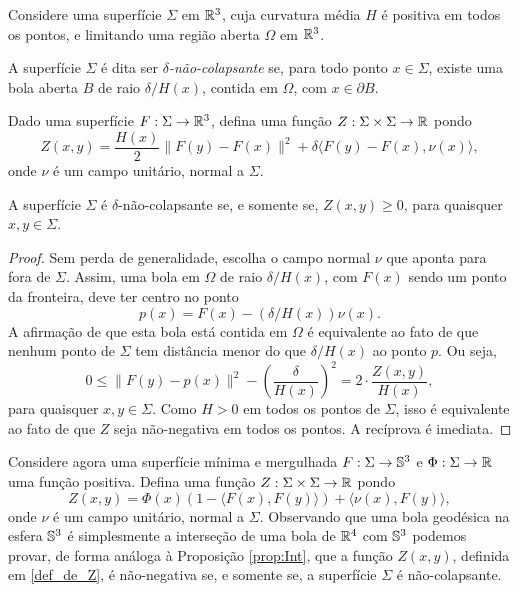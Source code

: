 Considere uma superf\'icie $\Sigma$ em $\mathbb R^3$, cuja curvatura
m\'edia $H$ \'e positiva em todos os pontos, e limitando uma 
regi\~ao aberta $\Omega$ em $\mathbb R^3$.

\begin{definicao}
	A superf\'icie $\Sigma$ \'e dita ser {\em $\delta$-n\~ao-colapsante}
	se, para todo ponto $x\in\Sigma$, existe uma bola aberta $B$ de
	raio $\delta/H(x)$, contida em $\Omega$, com $x\in\partial B$. 
\end{definicao}

Dado uma superf\'icie $F:\Sigma\to\mathbb R^3$, defina uma fun\c c\~ao
$Z:\Sigma\times\Sigma\to\mathbb R$ pondo
\[
Z(x,y) = \frac{H(x)}{2}\|F(y)-F(x)\|^2 + \delta\langle F(y)-F(x), \nu(x)\rangle,
\]
onde $\nu$ \'e um campo unit\'ario, normal a $\Sigma$.

\begin{proposicao}\label{prop:Int}
	A superf\'icie $\Sigma$ \'e $\delta$-n\~ao-colapsante se, e somente
	se, $Z(x,y)\geq0$, para quaisquer $x,y\in\Sigma$.
\end{proposicao}
\begin{proof}
	Sem perda de generalidade, escolha o campo normal $\nu$ que
	aponta para fora de $\Sigma$. Assim, uma bola em $\Omega$ de
	raio $\delta/H(x)$, com $F(x)$ sendo um ponto da fronteira, deve
	ter centro no ponto
	\[
	p(x) = F(x) - (\delta/H(x))\nu(x).
	\]
	A afirma\c c\~ao de que esta bola est\'a contida em $\Omega$
	\'e equivalente ao fato de que nenhum ponto de $\Sigma$ tem
	dist\^ancia menor do que $\delta/H(x)$ ao ponto $p$. Ou seja,
	\[
	0\leq\|F(y)-p(x)\|^2-\left(\frac{\delta}{H(x)}\right)^2 = 
	2\cdot\frac{Z(x,y)}{H(x)},
	\]
	para quaisquer $x,y\in\Sigma$. Como $H>0$ em todos os pontos
	de $\Sigma$, isso \'e equivalente ao fato de que $Z$ seja
	n\~ao-negativa em todos os pontos. A rec\'iprova \'e imediata.
\end{proof}

Considere agora uma superf\'icie m\'inima e mergulhada 
$F:\Sigma\to\mathbb{S}^3$ e $ \Phi: \Sigma\to\mathbb R$ uma função positiva. Defina
uma função $Z:\Sigma\times\Sigma\to\mathbb R$ pondo
\begin{equation}\label{def_de_Z}
Z(x,y) = \Phi(x) (1 - \langle F(x),F(y) \rangle ) + \langle \nu(x), F(y) \rangle,
\end{equation}
onde $\nu$ \'e um campo unitário, normal a $\Sigma$. Observando que
uma bola geod\'esica na esfera $\mathbb{S}^3$ \'e simplesmente a interseção
de uma bola de $\mathbb R^4$ com $\mathbb{S}^3$ podemos provar, de forma
an\'aloga \`a Proposi\c c\~ao \ref{prop:Int}, que a fun\c c\~ao $Z(x,y)$,
definida em \eqref{def_de_Z}, \'e n\~ao-negativa se, e somente se,
a superf\'icie $\Sigma$ \'e n\~ao-colapsante.



